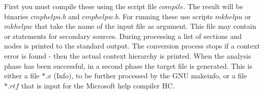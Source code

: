 First you must compile these using the script file $compile$. The result
will be binaries $cmphelpu.b$ and $cmphelpw.b$. For running these use
scripts $mkhelpu$ or $mkhelpw$ that take the name of the input file as
argument. This file may contain \verb|| or \verb|| statements
for secondary sources. During processing a list of sections and nodes is
printed to the standard output. The conversion process stops if a context
error is found - then the actual context hierarchy is printed. When the
analysis phase has been successful, in a second phase the target file is
generated. This is either a file $*.x$ (Info), to be further processed by
the GNU makeinfo, or a file $*.rtf$ that is input for the Microsoft help
compiler HC.


